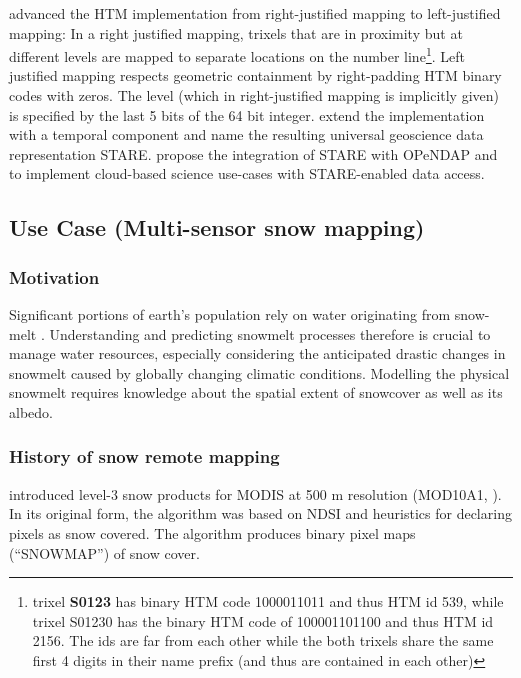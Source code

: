 \documentclass[a4paper,10pt]{article}
\begin{document}
\cite{Rilee2016} advanced the HTM implementation from right-justified mapping to left-justified mapping:
In a right justified mapping, trixels that are in proximity but at different levels are mapped to separate locations on the number line\footnote{trixel \textbf{S0123} has binary HTM code 1000011011 and thus HTM id 539, while trixel S01230 has the binary HTM code of 100001101100 and thus HTM id 2156. The ids are far from each other while the both trixels share the same first 4 digits in their name prefix (and thus are contained in each other)}.
Left justified mapping respects geometric containment by right-padding HTM binary codes with zeros.
The level (which in right-justified mapping is implicitly given) is specified by the last 5 bits of the 64 bit integer.
\cite{Kuo2017} extend the implementation with a temporal component and name the resulting universal geoscience data representation \gls{STARE}.
\cite{Rilee2018} propose the integration of \gls{STARE} with \gls{OPeNDAP} and to implement cloud-based science use-cases with \gls{STARE}-enabled data access.

\newpage

\subsection{Use Case (Multi-sensor snow mapping)}

\subsubsection{Motivation}
Significant portions of earth's population rely on water originating from snow-melt \citep{Barnett2005}.
Understanding and predicting snowmelt processes therefore is crucial to manage water resources, especially considering the anticipated drastic changes in snowmelt caused by globally changing climatic conditions. Modelling the physical snowmelt requires knowledge about the spatial extent of snowcover as well as its albedo.



\subsubsection{History of snow remote mapping}
\cite{Kharlamova2015, Hall2001} introduced level-3 snow products for \gls{MODIS} at 500 m resolution (MOD10A1, \cite{Hall2016}). In its original form, the algorithm was based on \gls{NDSI} and heuristics for declaring pixels as snow covered. The algorithm produces binary pixel maps (``SNOWMAP'') of snow cover.
\end{document}
